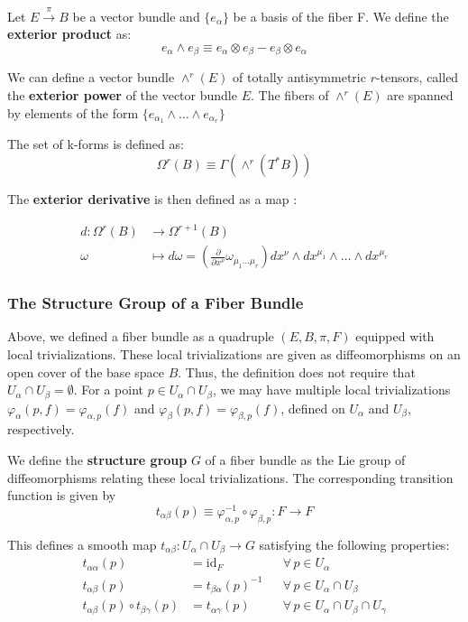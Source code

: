 Let $E \xrightarrow{\pi} B$ be a vector bundle and $\{e_\alpha\}$ be a basis of the fiber F. We define the \textbf{exterior product} as:
\[e_\alpha \wedge e_\beta \equiv e_\alpha \otimes e_\beta - e_\beta \otimes e_\alpha\]


We can define a vector bundle \( \wedge^r (E) \) of totally antisymmetric \( r \)-tensors, called the \textbf{exterior power} of the vector bundle \( E \). The fibers of \( \wedge^r (E) \) are spanned by elements of the form $\{ e_{\alpha_1} \wedge \dots \wedge e_{\alpha_r} \}$
 
The set of k-forms is defined as:
\[\Omega^r(B) \equiv \Gamma(\wedge^r (T^*B))\]


The \textbf{exterior derivative} is then defined as a map \cite{NakaharaGeometrytopologyphysics2005}:

\begin{align*}
  d: \Omega^r(B) &\to \Omega^{r+1}(B) \\
  \omega &\mapsto d\omega = \left( \frac{\partial}{ \partial x^\nu} \omega_{\mu_1 \dots \mu_r} \right) dx^\nu \wedge dx^{\mu_1} \wedge \dots \wedge dx^{\mu_r}
\end{align*}





\subsubsection*{The Structure Group of a Fiber Bundle}

Above, we defined a fiber bundle as a quadruple $(E, B, \pi, F)$ equipped with local trivializations. These local trivializations are given as diffeomorphisms on an open cover of the base space $B$. Thus, the definition does not require that $U_\alpha \cap U_\beta = \emptyset$. For a point $p \in U_\alpha \cap U_\beta$, we may have multiple local trivializations $\varphi_\alpha(p, f) = \varphi_{\alpha,p}(f)$ and $\varphi_\beta(p, f) = \varphi_{\beta,p}(f)$, defined on $U_\alpha$ and $U_\beta$, respectively. 

We define the \textbf{structure group} $G$ of a fiber bundle as the Lie group of diffeomorphisms relating these local trivializations. The corresponding transition function is given by
\[
t_{\alpha\beta}(p) \equiv \varphi_{\alpha,p}^{-1} \circ \varphi_{\beta,p} : F \to F
\]

This defines a smooth map $t_{\alpha\beta}: U_\alpha \cap U_\beta \to G$ satisfying the following properties:
\begin{align*}
  t_{\alpha \alpha}(p) &= \mathrm{id}_F && \forall\, p \in U_\alpha \\
  t_{\alpha\beta}(p) &= t_{\beta\alpha}(p)^{-1} && \forall\, p \in U_\alpha \cap U_\beta \\
  t_{\alpha\beta}(p) \circ t_{\beta\gamma}(p) &= t_{\alpha\gamma}(p) && \forall\, p \in U_\alpha \cap U_\beta \cap U_\gamma
\end{align*}

